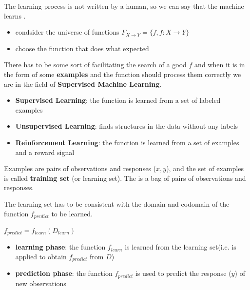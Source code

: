 The learning process is not written by a human, so we can say that the machine learns .
\begin{itemize}
    \item condsider the universe of functions $F_{X \to Y} = \{f, f:X \to Y\}$
    \item choose the function that does what expected
\end{itemize}


There has to be some sort of  facilitating the search of a good $f$ and when it is in the form of some \textbf{examples} and the function should process them correctly we are in the field of \textbf{Supervised Machine Learning}.
\begin{itemize}
    \item \textbf{Supervised Learning}: the function is learned from a set of labeled examples
    \item \textbf{Unsupervised Learning}: finds structures in the data without any labels
    \item \textbf{Reinforcement Learning}: the function is learned from a set of examples and a reward signal
\end{itemize}

Examples are pairs of observations and responses ($x,y$), and the set of examples is called \textbf{training set} (or learning set). The  is a bag of pairs of observations and responses.

The learning set has to be consistent with the domain and codomain of the function $f_{predict}$ to be learned.

\begin{center}
    $f_{predict} = f_{learn}(D_{learn})$
\end{center}

\begin{itemize}
    \item \textbf{learning phase}: the function $f_{learn}$ is learned from the learning set(i.e. is applied to obtain $f_{predict}$ from $D$)
    \item \textbf{prediction phase}: the function $f_{predict}$ is used to predict the response ($y$) of new observations
\end{itemize}


